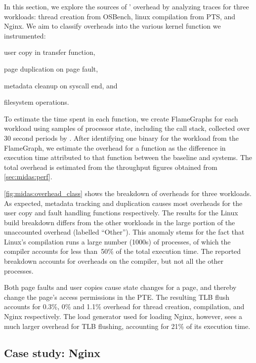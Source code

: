 In this section, we explore the sources of \midas' overhead by analyzing
 traces for three workloads: thread creation from OSBench, linux
compilation from PTS, and Nginx.
We aim to classify overheads into the various kernel function we instrumented:
\begin{inparaenum}
\item user copy in transfer function,
\item page duplication on page fault,
\item metadata cleanup on syscall end, and
\item filesystem operations.
\end{inparaenum}

To estimate the time spent in each function, we create FlameGraphs for
each workload\cite{GreggFlameGraph} using samples of processor state, including
the call stack, collected over 30 second periods by .
After identifying one binary for the workload from the FlameGraph, we estimate
the overhead for a function as the difference in execution time attributed to
that function between the baseline and \midas systems.
The total overhead is estimated from the throughput figures obtained from
\autoref{sec:midas:perf}.

\autoref{fig:midas:overhead_class} shows the breakdown of overheads for three
workloads.
As expected, metadata tracking and duplication causes most overheads
for the user copy and fault handling functions respectively.
The results for the Linux build breakdown differs 
from the other workloads
in the large portion of
the unaccounted overhead (labelled ``Other'').
This anomaly stems for the fact that Linux's compilation runs a large number (1000s)
of processes, of which the compiler accounts for less than~50\% of the
total execution time.
The reported breakdown accounts for overheads on the compiler, but not
all the other processes.

Both page faults and user copies cause state changes for a page, and thereby
change the page's access permissions in the PTE.
The resulting TLB flush accounts for 0.3\%, 0\% and 1.1\% overhead for
thread creation, compilation, and Nginx respectively.
The load generator  used for loading Nginx, however, sees
a much larger overhead for TLB flushing, accounting for
21\% of its execution time.

\subsection{Case study: Nginx}

